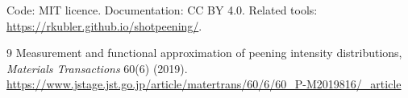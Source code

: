 \documentclass[11pt,a4paper]{article}
\begin{document}
\vfill
\noindent\small Code: MIT licence. Documentation: CC BY 4.0. Related tools: \url{https://rkubler.github.io/shotpeening/}.

\begin{thebibliography}{9}
 Measurement and functional approximation of peening intensity distributions, \emph{Materials Transactions} 60(6) (2019). \url{https://www.jstage.jst.go.jp/article/matertrans/60/6/60_P-M2019816/_article}
\end{thebibliography}
\end{document}
